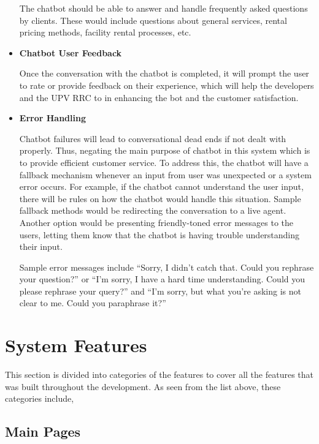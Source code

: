 \begin{itemize}
	The chatbot should be able to answer and handle frequently asked questions by clients. These would include questions about general services, rental pricing methods, facility rental processes, etc. \newline
	
	\item \textbf{Chatbot User Feedback}
	
	Once the conversation with the chatbot is completed, it will prompt the user to rate or provide feedback on their experience, which will help the developers and the UPV RRC to in enhancing the bot and the customer satisfaction. \newline
	
	\item \textbf{Error Handling}
	
	Chatbot failures will lead to conversational dead ends if not dealt with properly. Thus, negating the main purpose of chatbot in this system which is to provide efficient customer service. To address this, the chatbot will have a fallback mechanism whenever an input from user was unexpected or a system error occurs. For example, if the chatbot cannot understand the user input, there will be rules on how the chatbot would handle this situation. Sample fallback methods would be redirecting the conversation to a live agent. Another option would be presenting friendly-toned error messages to the users, letting them know that the chatbot is having trouble understanding their input.
	 
	\subitem Sample error messages include “Sorry, I didn't catch that. Could you rephrase your question?” or “I'm sorry, I have a hard time understanding. Could you please rephrase your query?” and “I'm sorry, but what you're asking is not clear to me. Could you paraphrase it?”
	
\end{itemize}

\section{System Features}

This section is divided into categories of the features to cover all the features that was built throughout the development. As seen from the list above, these categories include, 

\subsection{Main Pages}

